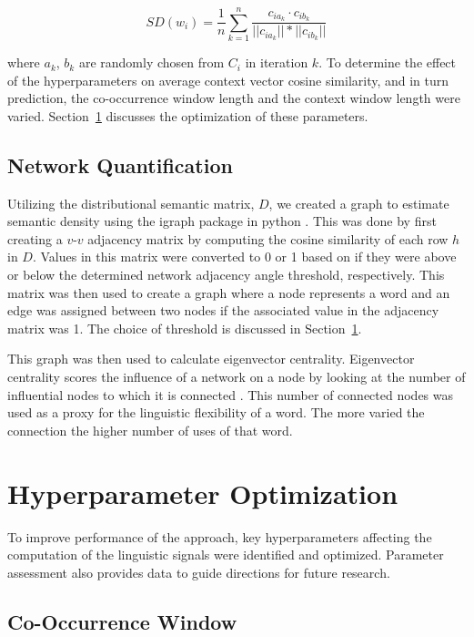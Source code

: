 \documentclass[11pt, a4paper]{article}
\begin{document}
\begin{equation*}
SD(w_{i}) = \frac{1}{n}\sum_{k=1}^{n} \frac{c_{ia_{k}}\cdotp c_{ib_{k}}}{||c_{ia_{k}}||* ||c_{ib_{k}}||}
\end{equation*}

\noindent where $a_{k}$, $b_{k}$ are randomly chosen from $C_{i}$ in iteration $k$. To determine the effect of the hyperparameters on average context vector cosine similarity, and in turn prediction, the co-occurrence window length and the context window length were varied. Section~\ref{optimization} discusses the optimization of these parameters.

\subsection{Network Quantification}
\label{subsect:network}

Utilizing the distributional semantic matrix, $D$, we created a graph to estimate semantic density using the igraph package in python \cite{Csardi2006}. This was done by first creating a $v$-$v$ adjacency matrix by computing the cosine similarity of each row $h$ in $D$. Values in this matrix were converted to 0 or 1 based on if they were above or below the determined network adjacency angle threshold, respectively. This matrix was then used to create a graph where a node represents a word and an edge was assigned between two nodes if the associated value in the adjacency matrix was 1. The choice of threshold is discussed in Section~\ref{optimization}.

This graph was then used to calculate eigenvector centrality. Eigenvector centrality scores the influence of a network on a node by looking at the number of influential nodes to which it is connected \cite{Estrada2005}. This number of connected nodes was used as a proxy for the linguistic flexibility of a word. The more varied the connection the higher number of uses of that word.

\section{Hyperparameter Optimization} \label{optimization}

To improve performance of the approach, key hyperparameters affecting the computation of the linguistic signals were identified and optimized.  Parameter assessment also provides data to guide directions for future research.

\subsection{Co-Occurrence Window}
\label{cooc window}
\end{document}
